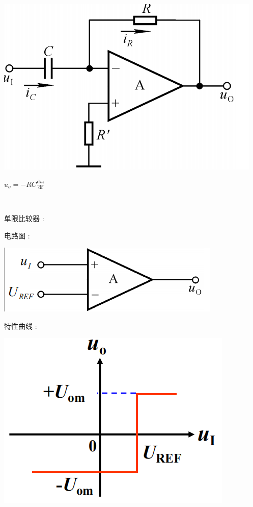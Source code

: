 \documentclass[UTF8, 12pt]{ctexart}
\begin{document}
	\includegraphics[scale = 0.4]{07/微分运算电路电路图.png}

	$ u_{o} = -RC\frac{\mathrm{d}u_{i}}{\mathrm{d}t} $

	~

	\noindent

	单限比较器 :

	电路图 :

	\includegraphics[scale = 0.4]{07/单限比较器电路图.png}

	特性曲线 :

	\includegraphics[scale = 0.4]{07/单限比较器特性曲线.png}
\end{document}
